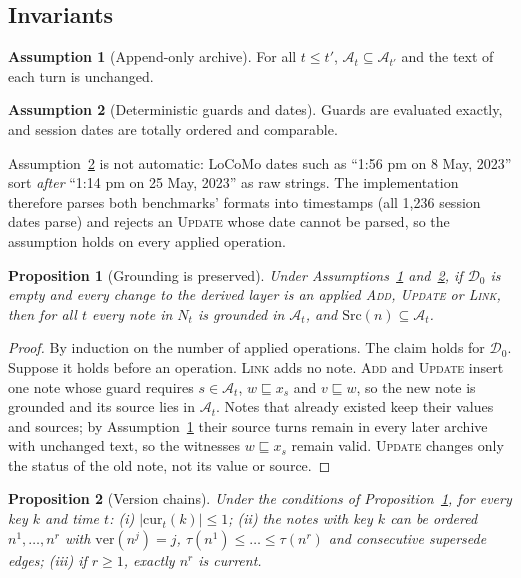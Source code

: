 \documentclass[10pt]{article}
\theoremstyle{plain}
\newtheorem{proposition}{Proposition}
\theoremstyle{definition}
\newtheorem{assumption}{Assumption}
\theoremstyle{remark}
\newcommand{\sub}{\sqsubseteq}
\newcommand{\A}{\mathcal{A}}
\newcommand{\D}{\mathcal{D}}
\begin{document}
\subsection{Invariants}

\begin{assumption}[Append-only archive]
\label{ass:archive}
For all $t\le t'$, $\A_t\subseteq\A_{t'}$ and the text of each turn is unchanged.
\end{assumption}

\begin{assumption}[Deterministic guards and dates]
\label{ass:det}
Guards are evaluated exactly, and session dates are totally ordered and
comparable.
\end{assumption}

Assumption~\ref{ass:det} is not automatic: LoCoMo dates such as
``1:56 pm on 8 May, 2023'' sort \emph{after} ``1:14 pm on 25 May, 2023'' as raw
strings. The implementation therefore parses both benchmarks' formats into
timestamps (all 1,236 session dates parse) and rejects an \textsc{Update} whose
date cannot be parsed, so the assumption holds on every applied operation.

\begin{proposition}[Grounding is preserved]
\label{prop:grounding}
Under Assumptions~\ref{ass:archive} and~\ref{ass:det}, if $\D_0$ is empty and every change to
the derived layer is an applied \textsc{Add}, \textsc{Update} or \textsc{Link},
then for all $t$ every note in $N_t$ is grounded in $\A_t$, and
$\mathrm{Src}(n)\subseteq\A_t$.
\end{proposition}

\begin{proof}
By induction on the number of applied operations. The claim holds for $\D_0$.
Suppose it holds before an operation. \textsc{Link} adds no note. \textsc{Add} and
\textsc{Update} insert one note whose guard requires $s\in\A_t$, $w\sub x_s$ and
$v\sub w$, so the new note is grounded and its source lies in $\A_t$. Notes that
already existed keep their values and sources; by Assumption~\ref{ass:archive} their source
turns remain in every later archive with unchanged text, so the witnesses
$w\sub x_s$ remain valid. \textsc{Update} changes only the status of the old
note, not its value or source.
\end{proof}

\begin{proposition}[Version chains]
\label{prop:chain}
Under the conditions of Proposition~\ref{prop:grounding}, for every key $k$ and time $t$:
(i) $|\mathrm{cur}_t(k)|\le 1$; (ii) the notes with key $k$ can be ordered
$n^1,\dots,n^r$ with $\mathrm{ver}(n^j)=j$, $\tau(n^1)\le\dots\le\tau(n^r)$ and
consecutive \textsf{supersede} edges; (iii) if $r\ge1$, exactly $n^r$ is current.
\end{proposition}
\end{document}
